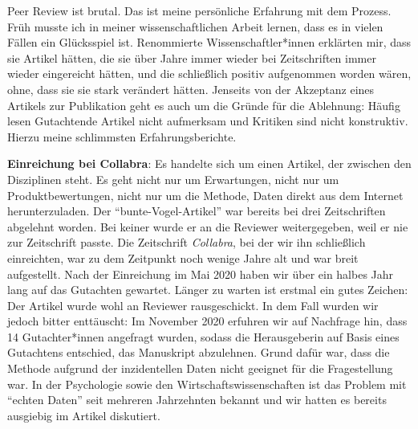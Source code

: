 \documentclass[
  letterpaper,
  DIV=11,
  numbers=noendperiod]{scrreprt}
\begin{document}
\begin{tcolorbox}[enhanced jigsaw, title=\textcolor{quarto-callout-note-color}{\faInfo}\hspace{0.5em}{Anekdoten: Meine schlimmsten Erfahrungen mit Peer Review}, colbacktitle=quarto-callout-note-color!10!white, rightrule=.15mm, titlerule=0mm, left=2mm, bottomrule=.15mm, arc=.35mm, leftrule=.75mm, toprule=.15mm, opacityback=0, breakable, bottomtitle=1mm, colframe=quarto-callout-note-color-frame, toptitle=1mm, opacitybacktitle=0.6, coltitle=black, colback=white]

Peer Review ist brutal. Das ist meine persönliche Erfahrung mit dem
Prozess. Früh musste ich in meiner wissenschaftlichen Arbeit lernen,
dass es in vielen Fällen ein Glücksspiel ist. Renommierte
Wissenschaftler*innen erklärten mir, dass sie Artikel hätten, die sie
über Jahre immer wieder bei Zeitschriften immer wieder eingereicht
hätten, und die schließlich positiv aufgenommen worden wären, ohne, dass
sie sie stark verändert hätten. Jenseits von der Akzeptanz eines
Artikels zur Publikation geht es auch um die Gründe für die Ablehnung:
Häufig lesen Gutachtende Artikel nicht aufmerksam und Kritiken sind
nicht konstruktiv. Hierzu meine schlimmsten Erfahrungsberichte.

\textbf{Einreichung bei Collabra}: Es handelte sich um einen Artikel,
der zwischen den Disziplinen steht. Es geht nicht nur um Erwartungen,
nicht nur um Produktbewertungen, nicht nur um die Methode, Daten direkt
aus dem Internet herunterzuladen. Der ``bunte-Vogel-Artikel'' war
bereits bei drei Zeitschriften abgelehnt worden. Bei keiner wurde er an
die Reviewer weitergegeben, weil er nie zur Zeitschrift passte. Die
Zeitschrift \emph{Collabra}, bei der wir ihn schließlich einreichten,
war zu dem Zeitpunkt noch wenige Jahre alt und war breit aufgestellt.
Nach der Einreichung im Mai 2020 haben wir über ein halbes Jahr lang auf
das Gutachten gewartet. Länger zu warten ist erstmal ein gutes Zeichen:
Der Artikel wurde wohl an Reviewer rausgeschickt. In dem Fall wurden wir
jedoch bitter enttäuscht: Im November 2020 erfuhren wir auf Nachfrage
hin, dass 14 Gutachter*innen angefragt wurden, sodass die Herausgeberin
auf Basis eines Gutachtens entschied, das Manuskript abzulehnen. Grund
dafür war, dass die Methode aufgrund der inzidentellen Daten nicht
geeignet für die Fragestellung war. In der Psychologie sowie den
Wirtschaftswissenschaften ist das Problem mit ``echten Daten'' seit
mehreren Jahrzehnten bekannt und wir hatten es bereits ausgiebig im
Artikel diskutiert.


\end{tcolorbox}
\end{document}
